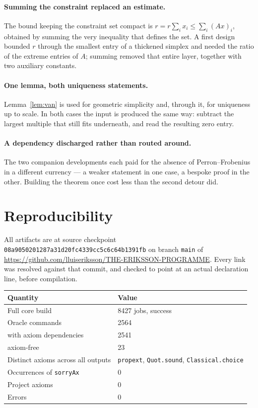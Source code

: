\documentclass[11pt]{article}
\theoremstyle{definition}
\newcommand{\anchor}{08a9050201287a31d20fc4339cc5c6c64b1391fb}
\begin{document}
\paragraph{Summing the constraint replaced an estimate.}  The bound keeping the
constraint set compact is $r=r\sum_i x_i\le\sum_i(Ax)_i$, obtained by summing
the very inequality that defines the set.  A first design bounded $r$ through
the smallest entry of a thickened simplex and needed the ratio of the extreme
entries of $A$; summing removed that entire layer, together with two auxiliary
constants.

\paragraph{One lemma, both uniqueness statements.}  Lemma~\ref{lem:van} is used
for geometric simplicity and, through it, for uniqueness up to scale.  In both
cases the input is produced the same way: subtract the largest multiple that
still fits underneath, and read the resulting zero entry.

\paragraph{A dependency discharged rather than routed around.}  The two
companion developments each paid for the absence of Perron--Frobenius in a
different currency --- a weaker statement in one case, a bespoke proof in the
other.  Building the theorem once cost less than the second detour did.

\section{Reproducibility}\label{sec:repro}

All artifacts are at source checkpoint \texttt{\anchor} on branch \texttt{main}
of \url{https://github.com/lluiseriksson/THE-ERIKSSON-PROGRAMME}.  Every link
was resolved against that commit, and checked to point at an actual declaration
line, before compilation.

\begin{center}
\begin{tabular}{ll}
\toprule
Quantity & Value \\
\midrule
Full core build & 8427 jobs, success \\
Oracle commands & 2564 \\
\quad with axiom dependencies & 2541 \\
\quad axiom-free & 23 \\
Distinct axioms across all outputs & \texttt{propext}, \texttt{Quot.sound}, \texttt{Classical.choice} \\
Occurrences of \texttt{sorryAx} & 0 \\
Project axioms & 0 \\
Errors & 0 \\
\bottomrule
\end{tabular}
\end{center}
\end{document}
